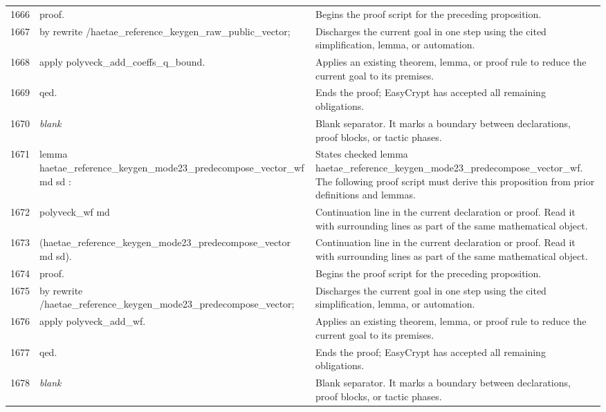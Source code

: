 \documentclass[10pt]{article}
\begin{document}
\begin{longtable}{r L{0.53\textwidth} L{0.37\textwidth}}
1666 & {\ttfamily\scriptsize proof.} & Begins the proof script for the preceding proposition. \\
1667 & {\ttfamily\scriptsize by rewrite /haetae\_reference\_keygen\_raw\_public\_vector;} & Discharges the current goal in one step using the cited simplification, lemma, or automation. \\
1668 & {\ttfamily\scriptsize    apply polyveck\_add\_coeffs\_q\_bound.} & Applies an existing theorem, lemma, or proof rule to reduce the current goal to its premises. \\
1669 & {\ttfamily\scriptsize qed.} & Ends the proof; EasyCrypt has accepted all remaining obligations. \\
1670 & {\ttfamily\scriptsize \emph{blank}} & Blank separator.  It marks a boundary between declarations, proof blocks, or tactic phases. \\
1671 & {\ttfamily\scriptsize lemma haetae\_reference\_keygen\_mode23\_predecompose\_vector\_wf md sd :} & States checked lemma haetae\_reference\_keygen\_mode23\_predecompose\_vector\_wf.  The following proof script must derive this proposition from prior definitions and lemmas. \\
1672 & {\ttfamily\scriptsize   polyveck\_wf md} & Continuation line in the current declaration or proof.  Read it with surrounding lines as part of the same mathematical object. \\
1673 & {\ttfamily\scriptsize     (haetae\_reference\_keygen\_mode23\_predecompose\_vector md sd).} & Continuation line in the current declaration or proof.  Read it with surrounding lines as part of the same mathematical object. \\
1674 & {\ttfamily\scriptsize proof.} & Begins the proof script for the preceding proposition. \\
1675 & {\ttfamily\scriptsize by rewrite /haetae\_reference\_keygen\_mode23\_predecompose\_vector;} & Discharges the current goal in one step using the cited simplification, lemma, or automation. \\
1676 & {\ttfamily\scriptsize    apply polyveck\_add\_wf.} & Applies an existing theorem, lemma, or proof rule to reduce the current goal to its premises. \\
1677 & {\ttfamily\scriptsize qed.} & Ends the proof; EasyCrypt has accepted all remaining obligations. \\
1678 & {\ttfamily\scriptsize \emph{blank}} & Blank separator.  It marks a boundary between declarations, proof blocks, or tactic phases. \\

\end{longtable}
\end{document}
